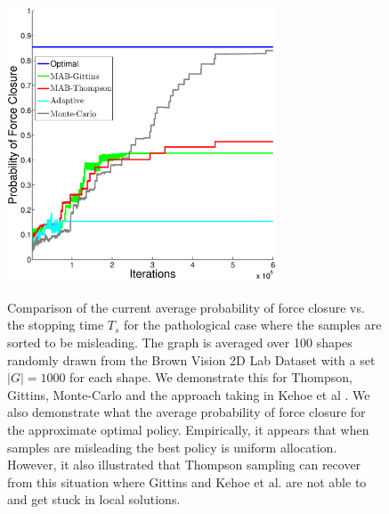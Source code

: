 \documentclass[a4paper, 10pt, conference]{ieeeconf}      %
\begin{document}
\begin{figure}[ht!]
\centering
\includegraphics[width = 8cm, height = 9cm]{matlab_figures/worst_case.eps}
\caption{ \footnotesize Comparison of the current average probability of force closure vs. the stopping time $T_s$ for the pathological case where the samples are sorted to be misleading. The graph is averaged over 100 shapes randomly drawn from the Brown Vision 2D Lab Dataset \cite{brown} with a set $|G|=1000$ for each shape.  We demonstrate this for Thompson, Gittins, Monte-Carlo and the approach taking in Kehoe et al \cite{kehoe2012toward}. We also demonstrate what the average probability of force closure for the approximate optimal policy. Empirically, it appears that when samples are misleading the best policy is uniform allocation. However, it also illustrated that Thompson sampling can recover from this situation where Gittins and Kehoe et al.  are not able to and get stuck in local solutions. }
\vspace*{-10pt}
\label{fig:worst_case}
\end{figure}
\end{document}

